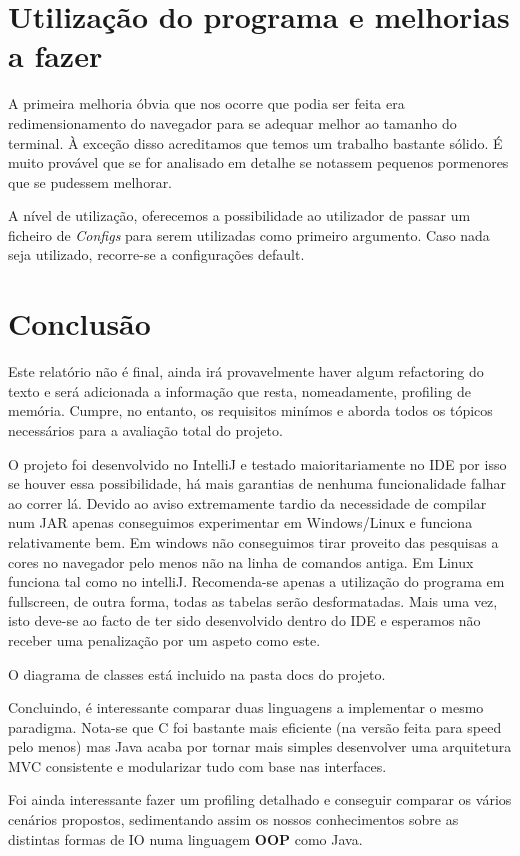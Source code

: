 \documentclass[11pt]{article}
\begin{document}
\section{Utilização do programa e melhorias a fazer}
A primeira melhoria óbvia que nos ocorre que podia ser feita era redimensionamento do navegador para se adequar melhor ao tamanho do terminal. À exceção disso acreditamos que temos um trabalho bastante sólido. É muito provável que se for analisado em detalhe se notassem pequenos pormenores que se pudessem melhorar.

A nível de utilização, oferecemos a possibilidade ao utilizador de passar um ficheiro de \textit{Configs} para serem utilizadas como primeiro argumento. Caso nada seja utilizado, recorre-se a configurações default.

\section{Conclusão}
Este relatório não é final, ainda irá provavelmente haver algum refactoring do texto e será adicionada a informação que resta, nomeadamente, profiling de memória. Cumpre, no entanto, os requisitos minímos e aborda todos os tópicos necessários para a avaliação total do projeto.

O projeto foi desenvolvido no IntelliJ e testado maioritariamente no IDE por isso se houver essa possibilidade, há mais garantias de nenhuma funcionalidade falhar ao correr lá. Devido ao aviso extremamente tardio da necessidade de compilar num JAR apenas conseguimos experimentar em Windows/Linux e funciona relativamente bem. Em windows não conseguimos tirar proveito das pesquisas a cores no navegador pelo menos não na linha de comandos antiga. Em Linux funciona tal como no intelliJ. Recomenda-se apenas a utilização do programa em fullscreen, de outra forma, todas as tabelas serão desformatadas. Mais uma vez, isto deve-se ao facto de ter sido desenvolvido dentro do IDE e esperamos não receber uma penalização por um aspeto como este.

O diagrama de classes está incluido na pasta docs do projeto.

Concluindo, é interessante comparar duas linguagens a implementar o mesmo paradigma. Nota-se que C foi bastante mais eficiente (na versão feita para speed pelo menos) mas Java acaba por tornar mais simples desenvolver uma arquitetura MVC consistente e modularizar tudo com base nas interfaces.

Foi ainda interessante fazer um profiling detalhado e conseguir comparar os vários cenários propostos, sedimentando assim os nossos conhecimentos sobre as distintas formas de IO numa linguagem \textbf{OOP} como Java.
\end{document}
